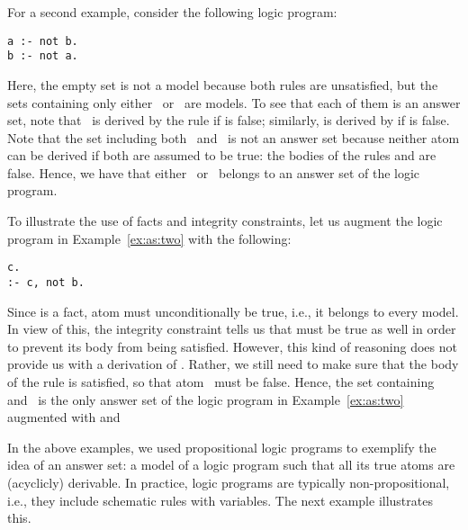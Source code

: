 \begin{example}\label{ex:as:two}
For a second example, consider the following logic program:
%
\begin{lstlisting}[numbers=none]
a :- not b.
b :- not a.
\end{lstlisting}
%
Here, the empty set is not a model because both rules are unsatisfied,
but the sets containing only either~ or~ are models.
To see that each of them is an answer set,
note that~ is derived by the rule 
if  is false;
similarly,
 is derived by 
if  is false.
Note that the set including both~ and~ is not an answer set
because neither atom can be derived if both are assumed to be true:
the bodies of the rules
 and
 are false.
Hence, we have that
either~ or~ belongs to
an answer set of the logic program.
\eexample
\end{example}

\begin{example}\label{ex:as:three}
To illustrate the use of facts and integrity constraints,
let us augment the logic program in Example~\ref{ex:as:two}
with the following:
\begin{lstlisting}[numbers=none]
c.
:- c, not b.
\end{lstlisting}
Since  is a fact,
atom  must unconditionally be true, i.e.,
it belongs to every model.
In view of this,
the integrity constraint 
tells us that  must be true as well
in order to prevent its body from being satisfied.
However, this kind of reasoning does not provide us with
a derivation of .
Rather, we still need to make sure that the body
of the rule  is satisfied,
so that atom~ must be false.
Hence, the set containing  and~
is the only answer set of the logic program
in Example~\ref{ex:as:two} augmented with 
and 
\eexample
\end{example}

In the above examples, 
we used propositional logic programs to exemplify the idea
of an answer set: a model of a logic program such that all its true atoms are 
(acyclicly) derivable.
In practice, logic programs are typically non-propositional, i.e.,
they include schematic rules with variables.
The next example illustrates this.

